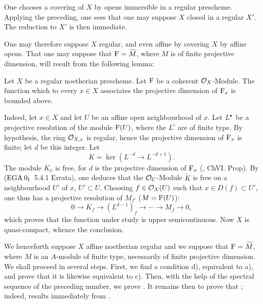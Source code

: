 One chooses a covering of $X$ by opens immersible in a regular prescheme. Applying the preceding, one sees that one may suppose $X$ closed in a regular $X'$. The reduction to $X'$ is then immediate.

One may therefore suppose $X$ regular, and even affine by covering $X$ by affine opens. That one may suppose that ${\operatorname{F}}=\widetilde{M}$, where $M$ is of finite projective dimension, will result from the following lemma:

\begin{lemma} \label{VIII.2.4}
Let $X$ be a regular noetherian prescheme. Let ${\operatorname{F}}$ be a coherent $\mathcal{O}_X$-Module. The function which to every $x\in X$ associates the projective dimension of ${\operatorname{F}}_x$ is bounded above.
\end{lemma}

\setcounter{equation}{1}

Indeed, let $x\in X$ and let $U$ be an affine open neighbourhood of $x$. Let $L^\boule$ be a projective resolution of the module ${\operatorname{F}}(U)$, where the $L^i$ are of finite type. By hypothesis, the ring ${\mathcal O}_{X, x}$ is regular, hence the projective dimension of ${\operatorname{F}}_x$ is finite; let $d$ be this integer. Let
\[
K=\ker(L^{-d}\to L^{-d+1}).
\]
The module $K_x$ is free, for $d$ is the projective dimension of ${\operatorname{F}}_x$ (\cite{M}, Ch\ptbl VI. Prop). By ($\textup{EGA}\kern.2em 0_{\textup{I}}$~5.4.1 Errata), one deduces that the ${\mathcal O}_U$-Module $\widetilde{K}$ is free on a neighbourhood $U'$ of $x$, $U'\subset U$. Choosing $f\in \mathcal{O}_X(U)$ such that $x\in D(f)\subset U'$, one thus has a projective resolution of $M_{f'}$ ($M={\operatorname{F}}(U)$):
\[0\to K_f \to (L^{d-1})_f\to \cdots \to M_f\to 0, \]
which proves that the function under study is upper semicontinuous. Now $X$ is quasi-compact, whence the conclusion.

We henceforth suppose $X$ affine noetherian regular and we suppose that \hbox{${\operatorname{F}}=\widetilde{M}$}, where $M$ is an $A$-module of finite type, necessarily of finite projective dimension. We shall proceed in several steps. First, we find a condition d), equivalent to a), and prove that it is likewise equivalent to c). Then, with the help of the spectral sequence of the preceding number, we prove \ALORS{}. It remains then to prove that \ALORS{}; indeed, \SSI{}\ALORS{} results immediately from \SSI{}\ALORS{}.

